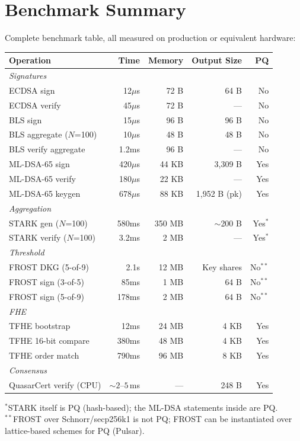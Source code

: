 \section{Benchmark Summary}


Complete benchmark table, all measured on production or equivalent hardware:

\begin{center}
\begin{tabular}{lrrrr}
\toprule
\textbf{Operation} & \textbf{Time} & \textbf{Memory} & \textbf{Output Size} & \textbf{PQ} \\
\midrule
\multicolumn{5}{l}{\textit{Signatures}} \\
ECDSA sign & 12$\mu$s & 72 B & 64 B & No \\
ECDSA verify & 45$\mu$s & 72 B & --- & No \\
BLS sign & 15$\mu$s & 96 B & 96 B & No \\
BLS aggregate ($N$=100) & 10$\mu$s & 48 B & 48 B & No \\
BLS verify aggregate & 1.2ms & 96 B & --- & No \\
ML-DSA-65 sign & 420$\mu$s & 44 KB & 3,309 B & Yes \\
ML-DSA-65 verify & 180$\mu$s & 22 KB & --- & Yes \\
ML-DSA-65 keygen & 678$\mu$s & 88 KB & 1,952 B (pk) & Yes \\
\midrule
\multicolumn{5}{l}{\textit{Aggregation}} \\
STARK gen ($N$=100) & 580ms & 350 MB & $\sim$200 B & Yes$^*$ \\
STARK verify ($N$=100) & 3.2ms & 2 MB & --- & Yes$^*$ \\
\midrule
\multicolumn{5}{l}{\textit{Threshold}} \\
FROST DKG (5-of-9) & 2.1s & 12 MB & Key shares & No$^{**}$ \\
FROST sign (3-of-5) & 85ms & 1 MB & 64 B & No$^{**}$ \\
FROST sign (5-of-9) & 178ms & 2 MB & 64 B & No$^{**}$ \\
\midrule
\multicolumn{5}{l}{\textit{FHE}} \\
TFHE bootstrap & 12ms & 24 MB & 4 KB & Yes \\
TFHE 16-bit compare & 380ms & 48 MB & 4 KB & Yes \\
TFHE order match & 790ms & 96 MB & 8 KB & Yes \\
\midrule
\multicolumn{5}{l}{\textit{Consensus}} \\
QuasarCert verify (CPU) & ${\sim}2$--$5$\,ms & --- & 248 B & Yes \\
\bottomrule
\end{tabular}
\end{center}

$^*$STARK itself is PQ (hash-based); the ML-DSA statements inside are PQ.\\
$^{**}$FROST over Schnorr/secp256k1 is not PQ; FROST can be instantiated over lattice-based schemes for PQ (Pulsar).

